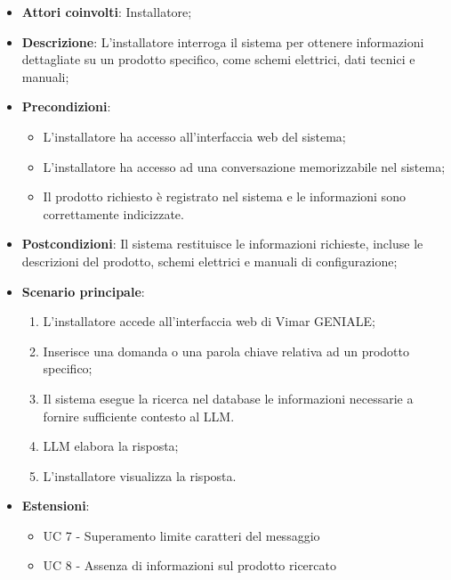 \begin{itemize}
    \item \textbf{Attori coinvolti}: Installatore;
    \item \textbf{Descrizione}: L’installatore interroga il sistema per ottenere informazioni dettagliate su un prodotto specifico, come schemi elettrici, dati tecnici e manuali;
    \item \textbf{Precondizioni}: 
        \begin{itemize}
            \item L’installatore ha accesso all’interfaccia web del sistema;
            \item L’installatore ha accesso ad una conversazione memorizzabile nel sistema;
            \item Il prodotto richiesto è registrato nel sistema e le informazioni sono correttamente indicizzate.
        \end{itemize}
    \item \textbf{Postcondizioni}: Il sistema restituisce le informazioni richieste, incluse le descrizioni del prodotto, schemi elettrici e manuali di configurazione;
    \item \textbf{Scenario principale}:
    \begin{enumerate}
    \item L’installatore accede all’interfaccia web di Vimar GENIALE;
    \item Inserisce una domanda o una parola chiave relativa ad un prodotto specifico;
    \item Il sistema esegue la ricerca nel database le informazioni necessarie a fornire sufficiente contesto al LLM.
    \item LLM elabora la risposta;
    \item L’installatore visualizza la risposta.
    \end{enumerate}
    \item \textbf{Estensioni}: 
        \begin{itemize}
            \item UC 7 - Superamento limite caratteri del messaggio
            \item UC 8 - Assenza di informazioni sul prodotto ricercato
        \end{itemize}
\end{itemize}

